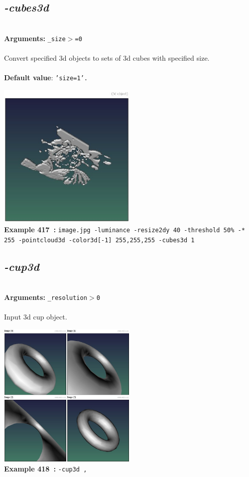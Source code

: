 \documentclass[a4paper,11pt,twoside]{book}
\begin{document}
\subsection{\emph{-cubes3d} }\vspace*{-0.5em}
~\\\textbf{Arguments: } 
{\small \texttt{\_size$>$=0}}\\~\\
Convert specified 3d objects to sets of 3d cubes with specified size.
~\\~\\\textbf{Default value}: {\small \texttt{'size=1'.}}
\begin{center}\includegraphics[keepaspectratio=true,height=7cm,width=\textwidth]{img/gmic_def417.jpg}\\
{\footnotesize \textbf{Example 417~:} \texttt{image.jpg -luminance -resize2dy 40 -threshold 50\% -* 255 -pointcloud3d -color3d[-1] 255,255,255 -cubes3d 1}}
\end{center}

\subsection{\emph{-cup3d} }\vspace*{-0.5em}
~\\\textbf{Arguments: } 
{\small \texttt{\_resolution$>$0}}\\~\\
Input 3d cup object.
\begin{center}\includegraphics[keepaspectratio=true,height=7cm,width=\textwidth]{img/gmic_def418.jpg}\\
{\footnotesize \textbf{Example 418~:} \texttt{-cup3d ,}}
\end{center}
\end{document}
